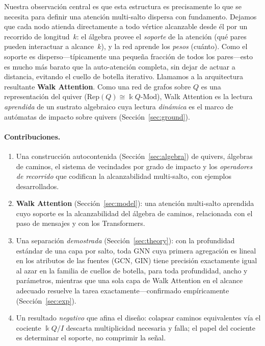 \documentclass[runningheads]{llncs}
\newcommand{\kk}{\Bbbk}
\newcommand{\kQ}{\kk Q}
\begin{document}
Nuestra observación central es que esta estructura es precisamente lo que se
necesita para definir una atención multi-salto dispersa con fundamento. Dejamos
que cada nodo atienda directamente a todo vértice alcanzable desde él por un
recorrido de longitud~$k$: el álgebra provee el \emph{soporte} de la atención
(qué pares pueden interactuar a alcance~$k$), y la red aprende los \emph{pesos}
(cuánto). Como el soporte es disperso---típicamente una pequeña fracción de
todos los pares---esto es mucho más barato que la auto-atención completa, sin
dejar de actuar a distancia, evitando el cuello de botella iterativo. Llamamos
a la arquitectura resultante \textbf{Walk Attention}. Como una red de grafos sobre
$Q$ es una representación del quiver
($\mathrm{Rep}(Q)\cong\kQ\text{-}\mathrm{Mod}$), Walk Attention es la lectura
\emph{aprendida} de un sustrato algebraico cuya lectura \emph{dinámica} es el
marco de autómatas de impacto sobre quivers \cite{zainea2026aiq}
(Sección~\ref{sec:ground}).

\paragraph{Contribuciones.}
\begin{enumerate}
  \item Una construcción autocontenida (Sección~\ref{sec:algebra}) de quivers,
  álgebras de caminos, el sistema de vecindades por grado de impacto y los
  \emph{operadores de recorrido} que codifican la alcanzabilidad multi-salto,
  con ejemplos desarrollados.
  \item \textbf{Walk Attention} (Sección~\ref{sec:model}): una atención
  multi-salto aprendida cuyo soporte es la alcanzabilidad del álgebra de
  caminos, relacionada con el paso de mensajes y con los Transformers.
  \item Una separación \emph{demostrada} (Sección~\ref{sec:theory}): con la
  profundidad estándar de una capa por salto, toda GNN cuya primera agregación
  es lineal en los atributos de las fuentes (GCN, GIN) tiene precisión
  exactamente igual al azar en la familia de cuellos de botella, para toda
  profundidad, ancho y parámetros, mientras que una sola capa de Walk Attention
  en el alcance adecuado resuelve la tarea exactamente---confirmado
  empíricamente (Sección~\ref{sec:exp}).
  \item Un resultado \emph{negativo} que afina el diseño: colapsar caminos
  equivalentes vía el cociente $\kQ/I$ descarta multiplicidad necesaria y
  falla; el papel del cociente es determinar el soporte, no comprimir la señal.
\end{enumerate}
\end{document}
